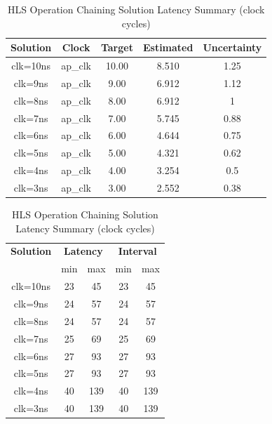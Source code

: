 \begin{table}[H]
    \centering
    \begin{minipage}[t]{0.38\linewidth}
        \centering
        \begin{tabular}{|c|c|c|c|c|}
            \hline
            \textbf{Solution} & \textbf{Clock} & \textbf{Target} & \textbf{Estimated} & \textbf{Uncertainty} \\
            \hline
            clk=10ns & ap\_clk & 10.00 & 8.510 & 1.25 \\
            \hline
            clk=9ns & ap\_clk & 9.00 & 6.912 & 1.12 \\
            \hline
            clk=8ns & ap\_clk & 8.00 & 6.912 & 1 \\
            \hline
            clk=7ns & ap\_clk & 7.00 & 5.745 & 0.88 \\
            \hline
            clk=6ns & ap\_clk & 6.00 & 4.644 & 0.75 \\
            \hline
            clk=5ns & ap\_clk & 5.00 & 4.321 & 0.62 \\
            \hline
            clk=4ns & ap\_clk & 4.00 & 3.254 & 0.5 \\
            \hline
            clk=3ns & ap\_clk & 3.00 & 2.552 & 0.38 \\
            \hline
        \end{tabular}
        \caption{HLS Operation Chaining Solution Timing Summary (ns)}
        \label{tab:hls-operation-chaining-solution-timing-summary}
    \end{minipage}
    \hfill
    \begin{minipage}[t]{0.38\linewidth}
        \centering
        \begin{tabular}{|c|c|c|c|c|}
            \hline
            \multicolumn{1}{|c|}{\textbf{Solution}} & \multicolumn{2}{|c|}{\textbf{Latency}} & \multicolumn{2}{|c|}{\textbf{Interval}} \\
            & min & max & min & max \\
            \hline
            clk=10ns & 23 & 45 & 23 & 45 \\
            \hline
            clk=9ns & 24 & 57 & 24 & 57 \\
            \hline
            clk=8ns & 24 & 57 & 24 & 57 \\
            \hline
            clk=7ns & 25 & 69 & 25 & 69 \\
            \hline
            clk=6ns & 27 & 93 & 27 & 93 \\
            \hline
            clk=5ns & 27 & 93 & 27 & 93 \\
            \hline
            clk=4ns & 40 & 139 & 40 & 139 \\
            \hline
            clk=3ns & 40 & 139 & 40 & 139 \\
            \hline
        \end{tabular}
        \caption{HLS Operation Chaining Solution Latency Summary (clock cycles)}
        \label{tab:hls-unoptimized-solution-latency-summary}
    \end{minipage}
\end{table}

